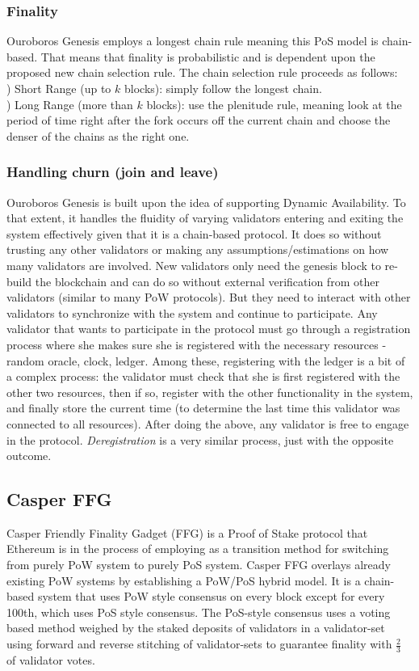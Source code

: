 \documentclass[10pt,journal,compsoc]{IEEEtran}
\begin{document}
\subsubsection{Finality}
Ouroboros Genesis employs a longest chain rule meaning this PoS model is chain-based. That means that finality is probabilistic and is dependent upon the proposed new chain selection rule. The chain selection rule proceeds as follows: 
\\
) Short Range (up to $k$ blocks): simply follow the longest \indent chain.
\\
) Long Range (more than $k$ blocks): use the plenitude \indent rule, meaning look at the period of time right after the \indent fork occurs off the current chain and choose the denser \indent of the chains as the right one.

\subsubsection{Handling churn (join and leave)}
Ouroboros Genesis is built upon the idea of supporting Dynamic Availability. To that extent, it handles the fluidity of varying validators entering and exiting the system effectively given that it is a chain-based protocol. It does so without trusting any other validators or making any assumptions/estimations on how many validators are involved. New validators only need the genesis block to re-build the blockchain and can do so without external verification from other validators (similar to many PoW protocols). But they need to interact with other validators to synchronize with the system and continue to participate. Any validator that wants to participate in the protocol must go through a registration process where she makes sure she is registered with the necessary resources - random oracle, clock, ledger. Among these, registering with the ledger is a bit of a complex process: the validator must check that she is first registered with the other two resources, then if so, register with the other functionality in the system, and finally store the current time (to determine the last time this validator was connected to all resources). After doing the above, any validator is free to engage in the protocol. \emph{Deregistration} is a very similar process, just with the opposite outcome.

\subsection{Casper FFG}
Casper Friendly Finality Gadget (FFG) \cite{FFG} is a Proof of Stake protocol that Ethereum is in the process of employing as a transition method for switching from purely PoW system to purely PoS system. Casper FFG overlays already existing PoW systems by establishing a PoW/PoS hybrid model. It is a chain-based system that uses PoW style consensus on every block except for every 100th, which uses PoS style consensus. The PoS-style consensus uses a voting based method weighed by the staked deposits of validators in a validator-set using forward and reverse stitching of validator-sets to guarantee finality with \(\frac{2}{3}\) of validator votes.
\end{document}
